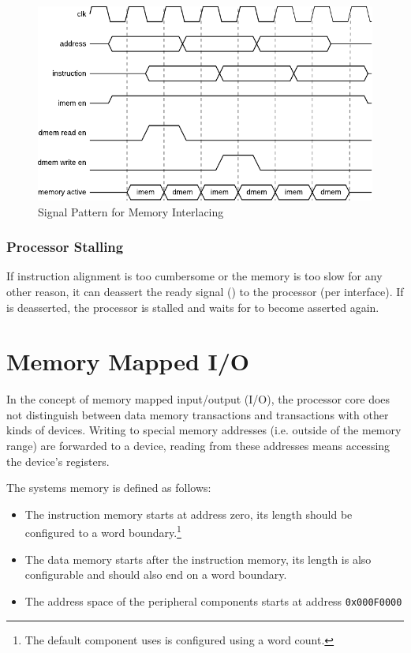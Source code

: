 \begin{figure}[htb]
	\centering
	\includegraphics[scale=1]{./figures/signal_mem_interlacing.pdf}
	\caption{Signal Pattern for Memory Interlacing}
	\label{fig:signal_mem_interlacing}
\end{figure}

\subsubsection{Processor Stalling}
If instruction alignment is too cumbersome or the memory is too slow for any other reason, it can deassert the ready signal () to the processor (per interface).
If  is deasserted, the processor is stalled and waits for  to become asserted again.

\section{Memory Mapped I/O}
\label{sec:memmappedio}
In the concept of memory mapped input/output (I/O), the processor core does not distinguish between data memory transactions and transactions with other kinds of devices.
Writing to special memory addresses (i.e. outside of the memory range) are forwarded to a device, reading from these addresses means accessing the device's registers.

The systems memory is defined as follows:
\begin{itemize}
\item The instruction memory starts at address zero, its length should be configured to a word boundary.\footnote{The default component uses is configured using a word count.}
\item The data memory starts after the instruction memory, its length is also configurable and should also end on a word boundary.
\item The address space of the peripheral components starts at address \verb=0x000F0000=
\end{itemize}

